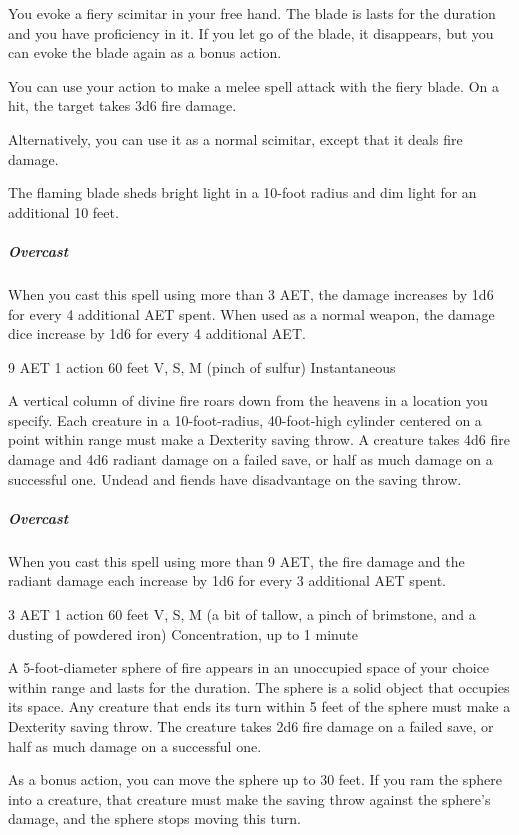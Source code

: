You evoke a fiery scimitar in your free hand. The blade is lasts for the duration and you have proficiency in it. If you let go of the blade, it disappears, but you can evoke the blade again as a bonus action.

You can use your action to make a melee spell attack with the fiery blade. On a hit, the target takes 3d6 fire damage.

Alternatively, you can use it as a normal scimitar, except that it deals fire damage.

The flaming blade sheds bright light in a 10-foot radius and dim light for an additional 10 feet.

\subparagraph*{Overcast} When you cast this spell using more than 3 AET, the damage increases by 1d6 for every 4 additional AET spent. When used as a normal weapon, the damage dice increase by 1d6 for every 4 additional AET.


{9 AET}
{1 action}
{60 feet}
{V, S, M (pinch of sulfur)}
{Instantaneous}

A vertical column of divine fire roars down from the heavens in a location you specify. Each creature in a 10-foot-radius, 40-foot-high cylinder centered on a point within range must make a Dexterity saving throw. A creature takes 4d6 fire damage and 4d6 radiant damage on a failed save, or half as much damage on a successful one. Undead and fiends have disadvantage on the saving throw.

\subparagraph*{Overcast} When you cast this spell using more than 9 AET, the fire damage and the radiant damage each increase by 1d6 for every 3 additional AET spent.


{3 AET}
{1 action}
{60 feet}
{V, S, M (a bit of tallow, a pinch of brimstone, and a dusting of powdered iron)}
{Concentration, up to 1 minute}

A 5-foot-diameter sphere of fire appears in an unoccupied space of your choice within range and lasts for the duration. The sphere is a solid object that occupies its space. Any creature that ends its turn within 5 feet of the sphere must make a Dexterity saving throw. The creature takes 2d6 fire damage on a failed save, or half as much damage on a successful one.

As a bonus action, you can move the sphere up to 30 feet. If you ram the sphere into a creature, that creature must make the saving throw against the sphere's damage, and the sphere stops moving this turn.

